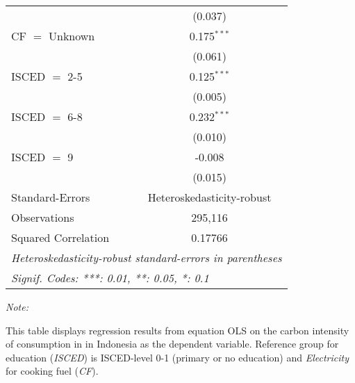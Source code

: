 \begin{table}[htbp!]
\begin{adjustbox}{width = 1\textwidth, max height = 0.95\textheight, center}
\begin{threeparttable}[b]
\begin{tabular}{lc}
                                & (0.037)\\   
            CF $=$ Unknown      & 0.175$^{***}$\\   
                                & (0.061)\\   
            ISCED $=$ 2-5       & 0.125$^{***}$\\   
                                & (0.005)\\   
            ISCED $=$ 6-8       & 0.232$^{***}$\\   
                                & (0.010)\\   
            ISCED $=$ 9         & -0.008\\   
                                & (0.015)\\   
            \midrule 
            Standard-Errors     & Heteroskedasticity-robust \\   
            Observations        & 295,116\\  
            Squared Correlation & 0.17766\\  
            \midrule \midrule
            \multicolumn{2}{l}{\emph{Heteroskedasticity-robust standard-errors in parentheses}}\\
            \multicolumn{2}{l}{\emph{Signif. Codes: ***: 0.01, **: 0.05, *: 0.1}}\\
         \end{tabular}
         
         \begin{tablenotes}\item \medskip \textit{Note:}
            \item This table displays regression results from equation OLS on the carbon intensity of consumption in  in Indonesia as the dependent variable. Reference group for education (\textit{ISCED}) is ISCED-level 0-1 (primary or no education) and \textit{Electricity} for cooking fuel (\textit{CF}).
         \end{tablenotes}
      \end{threeparttable}
   \end{adjustbox}
\end{table}


